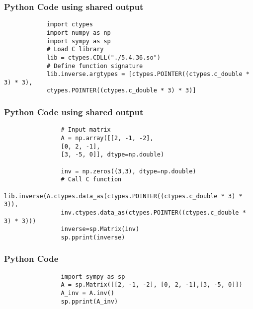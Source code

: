 \documentclass{beamer}
\begin{document}
		
		\begin{frame}[fragile]
			\frametitle{Python Code using shared output}
			\begin{lstlisting}
			import ctypes
			import numpy as np
			import sympy as sp
			# Load C library
			lib = ctypes.CDLL("./5.4.36.so")
			# Define function signature
			lib.inverse.argtypes = [ctypes.POINTER((ctypes.c_double * 3) * 3),
			ctypes.POINTER((ctypes.c_double * 3) * 3)]
			\end{lstlisting}
		\end{frame}
		\begin{frame}[fragile]
			\frametitle{Python Code using shared output}
			\begin{lstlisting}		
				# Input matrix
				A = np.array([[2, -1, -2],
				[0, 2, -1],
				[3, -5, 0]], dtype=np.double)
				
				inv = np.zeros((3,3), dtype=np.double)
				# Call C function
				lib.inverse(A.ctypes.data_as(ctypes.POINTER((ctypes.c_double * 3) * 3)),
				inv.ctypes.data_as(ctypes.POINTER((ctypes.c_double * 3) * 3)))
				inverse=sp.Matrix(inv)
				sp.pprint(inverse)
			\end{lstlisting}
		\end{frame}
		
		\begin{frame}[fragile]
			\frametitle{Python Code}
			\begin{lstlisting}
				import sympy as sp
				A = sp.Matrix([[2, -1, -2], [0, 2, -1],[3, -5, 0]])
				A_inv = A.inv()
				sp.pprint(A_inv) 
			\end{lstlisting}
			
		\end{frame}
		
		
		
	
\end{document}

